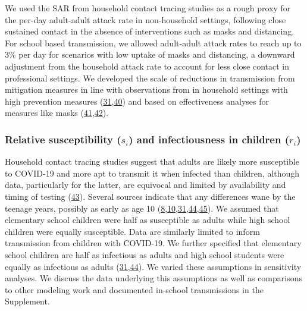 \documentclass[
]{article}
\begin{document}
We used the SAR from household contact tracing studies as a rough proxy
for the per-day adult-adult attack rate in non-household settings,
following close sustained contact in the absence of interventions such
as masks and distancing. For school based transmission, we allowed
adult-adult attack rates to reach up to 3\% per day for scenarios with
low uptake of masks and distancing, a downward adjustment from the
household attack rate to account for less close contact in professional
settings. We developed the scale of reductions in transmission from
mitigation measures in line with observations from in household settings
with high prevention measures
(\protect\hyperlink{ref-park_early_nodate}{31},\protect\hyperlink{ref-cheng_contact_2020}{40})
and based on effectiveness analyses for measures like masks
(\protect\hyperlink{ref-clapp_evaluation_2020}{41},\protect\hyperlink{ref-chu_physical_2020}{42}).

\medskip

\hypertarget{relative-susceptibility-s_i-and-infectiousness-in-children-r_i}{%
\subsubsection{\texorpdfstring{Relative susceptibility (\(s_i\)) and
infectiousness in children
(\(r_i\))}{Relative susceptibility (s\_i) and infectiousness in children (r\_i)}}\label{relative-susceptibility-s_i-and-infectiousness-in-children-r_i}}

Household contact tracing studies suggest that adults are likely more
susceptible to COVID-19 and more apt to transmit it when infected than
children, although data, particularly for the latter, are equivocal and
limited by availability and timing of testing
(\protect\hyperlink{ref-viner_susceptibility_2020}{43}). Several sources
indicate that any differences wane by the teenage years, possibly as
early as age 10
(\protect\hyperlink{ref-fontanet_sars-cov-2_2020}{8},\protect\hyperlink{ref-stein-zamir_large_2020}{10},\protect\hyperlink{ref-park_early_nodate}{31},\protect\hyperlink{ref-dattner_role_2020}{44},\protect\hyperlink{ref-fontanet_cluster_2020}{45}).
We assumed that elementary school children were half as susceptible as
adults while high school children were equally susceptible. Data are
similarly limited to inform transmission from children with COVID-19. We
further specified that elementary school children are half as infectious
as adults and high school students were equally as infectious as adults
(\protect\hyperlink{ref-park_early_nodate}{31},\protect\hyperlink{ref-dattner_role_2020}{44}).
We varied these assumptions in sensitivity analyses. We discuss the data
underlying this assumptions as well as comparisons to other modeling
work and documented in-school transmissions in the Supplement.
\end{document}
